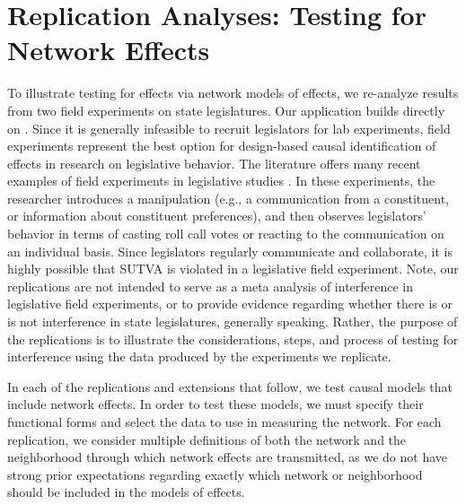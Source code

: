 \documentclass[12pt]{article}
\begin{document}
\section{Replication Analyses: Testing for Network Effects}

To illustrate testing for effects via network models of effects, we re-analyze results from two field experiments on state legislatures. Our application builds directly on \citet{coppock2014information}. Since it is generally infeasible to recruit legislators for lab experiments, field experiments represent the best option for design-based causal identification of effects in research on legislative behavior. The literature offers many recent examples of field experiments in legislative studies \citep[e.g., ][]{bergan2009does,butler2011politicians,butler2012field,broockman2013black,nyhan2015effect,bergan2015call}. In these experiments, the researcher introduces a manipulation (e.g., a communication from a constituent, or information about constituent preferences), and then observes legislators' behavior in terms of casting roll call votes or reacting to the communication on an individual basis. Since legislators regularly communicate and collaborate, it is highly possible that SUTVA is violated in a legislative field experiment. Note, our replications are not intended to serve as a meta analysis of interference in legislative field experiments, or to provide evidence regarding whether there is or is not interference in state legislatures, generally speaking. Rather, the purpose of the replications is to illustrate the considerations, steps, and process of testing for interference using the data produced by the experiments we replicate. 

In each of the replications and extensions that follow, we test causal models that include network effects. In order to test these models, we must specify their functional forms and select the data to use in measuring the network. For each replication, we consider multiple definitions of both the network and the neighborhood through which network effects are transmitted, as we do not have strong prior expectations regarding exactly which network or neighborhood should be included in the models of effects. 
\end{document}

